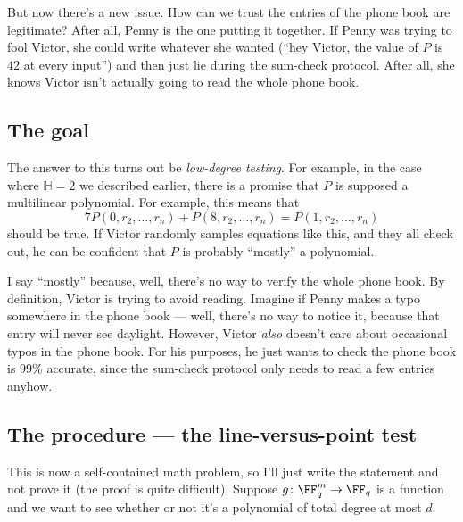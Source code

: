 \documentclass[11pt]{scrreprt}
\newcommand{\HH}{\mathbb H}
\begin{document}
But now there's a new issue.
How can we trust the entries of the phone book are legitimate?
After all, Penny is the one putting it together.
If Penny was trying to fool Victor, she could write whatever she wanted
(``hey Victor, the value of $P$ is $42$ at every input'')
and then just lie during the sum-check protocol.
After all, she knows Victor isn't actually going to read the whole phone book.

\subsection{The goal}
The answer to this turns out be \emph{low-degree testing}.
For example, in the case where $\HH = 2$ we described earlier,
there is a promise that $P$ is supposed a multilinear polynomial.
For example, this means that
\[ 7P(0, r_2, \dots, r_n) + P(8, r_2, \dots, r_n) = P(1, r_2, \dots, r_n) \]
should be true.
If Victor randomly samples equations like this, and they all check out,
he can be confident that $P$ is probably ``mostly'' a polynomial.

I say ``mostly'' because, well, there's no way to verify the whole phone book.
By definition, Victor is trying to avoid reading.
Imagine if Penny makes a typo somewhere in the phone book ---
well, there's no way to notice it, because that entry will never see daylight.
However, Victor \emph{also} doesn't care about occasional typos in the phone book.
For his purposes, he just wants to check the phone book is 99\% accurate,
since the sum-check protocol only needs to read a few entries anyhow.

\subsection{The procedure --- the line-versus-point test}
This is now a self-contained math problem, so I'll just write the statement
and not prove it (the proof is quite difficult).
Suppose $g \colon \FF_q^m \to \FF_q$ is a function
and we want to see whether or not it's a polynomial of total degree at most $d$.
\end{document}
